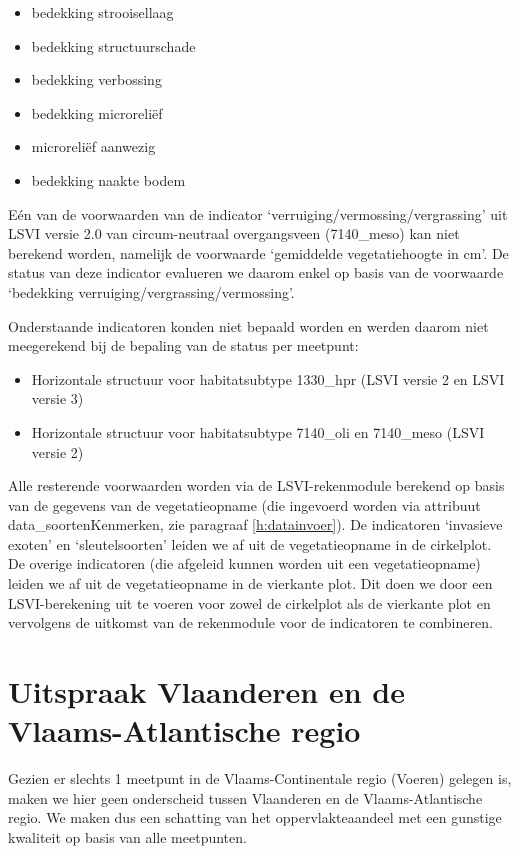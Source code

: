 \documentclass[twoside]{extreport}
\begin{document}
\begin{itemize}
\tightlist
\item
  bedekking strooisellaag
\item
  bedekking structuurschade
\item
  bedekking verbossing
\item
  bedekking microreliëf
\item
  microreliëf aanwezig
\item
  bedekking naakte bodem
\end{itemize}

Eén van de voorwaarden van de indicator
`verruiging/vermossing/vergrassing' uit LSVI versie 2.0 van
circum-neutraal overgangsveen (7140\_meso) kan niet berekend worden,
namelijk de voorwaarde `gemiddelde vegetatiehoogte in cm'. De status van
deze indicator evalueren we daarom enkel op basis van de voorwaarde
`bedekking verruiging/vergrassing/vermossing'.

Onderstaande indicatoren konden niet bepaald worden en werden daarom
niet meegerekend bij de bepaling van de status per meetpunt:

\begin{itemize}
\tightlist
\item
  Horizontale structuur voor habitatsubtype 1330\_hpr (LSVI versie 2 en
  LSVI versie 3)
\item
  Horizontale structuur voor habitatsubtype 7140\_oli en 7140\_meso
  (LSVI versie 2)
\end{itemize}

Alle resterende voorwaarden worden via de LSVI-rekenmodule berekend op
basis van de gegevens van de vegetatieopname (die ingevoerd worden via
attribuut data\_soortenKenmerken, zie paragraaf \ref{h:datainvoer}). De
indicatoren `invasieve exoten' en `sleutelsoorten' leiden we af uit de
vegetatieopname in de cirkelplot. De overige indicatoren (die afgeleid
kunnen worden uit een vegetatieopname) leiden we af uit de
vegetatieopname in de vierkante plot. Dit doen we door een
LSVI-berekening uit te voeren voor zowel de cirkelplot als de vierkante
plot en vervolgens de uitkomst van de rekenmodule voor de indicatoren te
combineren.

\section{Uitspraak Vlaanderen en de Vlaams-Atlantische
regio}\label{uitspraak-vlaanderen-en-de-vlaams-atlantische-regio}

Gezien er slechts 1 meetpunt in de Vlaams-Continentale regio (Voeren)
gelegen is, maken we hier geen onderscheid tussen Vlaanderen en de
Vlaams-Atlantische regio. We maken dus een schatting van het
oppervlakteaandeel met een gunstige kwaliteit op basis van alle
meetpunten.
\end{document}
